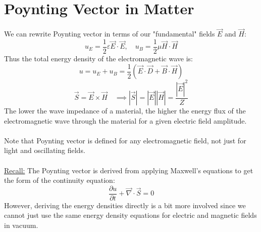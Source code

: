 \documentclass[12pt]{article}
\begin{document}
\section*{Poynting Vector in Matter}
We can rewrite Poynting vector in terms of our "fundamental" fields $\vec{E}$ and $\vec{H}$:
\[u_E = \frac{1}{2}\varepsilon \vec{E} \cdot \vec{E}, \quad u_B = \frac{1}{2}\mu \vec{H} \cdot \vec{H}\]
Thus the total energy density of the electromagnetic wave is:
\[u = u_E + u_B = \frac{1}{2}(\vec{E}\cdot\vec{D}+\vec{B}\cdot\vec{H})\]
\[\boxed{\vec{S} = \vec{E} \times \vec{H} \quad\implies|\vec{S}| = |\vec{E}||\vec{H}| = \frac{|\vec{E}|^2}{Z}}\]
The lower the wave impedance of a material, the higher the energy flux of the electromagnetic wave through the material for a given electric field amplitude.\\\\
Note that Poynting vector is defined for any electromagnetic field, not just for light and oscillating fields.\\\\
\underline{Recall:} The Poynting vector is derived from applying Maxwell's equations to get the form of the continuity equation:
\[\frac{\partial u}{\partial t} + \vec{\nabla} \cdot \vec{S} = 0\]
However, deriving the energy densities directly is a bit more involved since we cannot just use the same energy density equations for electric and magnetic fields in vacuum.
\end{document}
